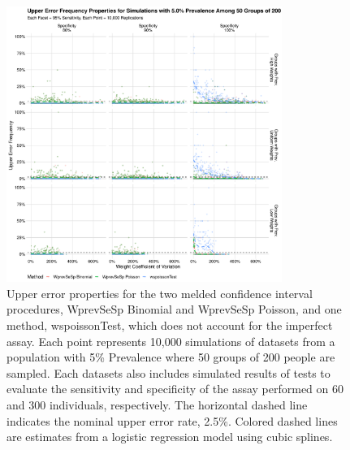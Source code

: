 \documentclass[AMA,STIX1COL]{WileyNJD-v2}
\begin{document}
\begin{figure}
\centering
\includegraphics[width=0.8\textwidth]{figures/imperfect_upper_error_frequency_50_groups_0_05_prev.pdf}
\caption{Upper error properties for the two melded confidence interval procedures, WprevSeSp Binomial and WprevSeSp Poisson, and one method, wspoissonTest, which does not account for the imperfect assay.
Each point represents 10,000 simulations of datasets from a population with 5\% Prevalence where 50 groups of 200 people are sampled.
Each datasets also includes simulated results of tests to evaluate the sensitivity and specificity of the assay performed on 60 and 300 individuals, respectively.
The horizontal dashed line indicates the nominal upper error rate, 2.5\%.
Colored dashed lines are estimates from a logistic regression model using cubic splines.}
\label{fig:imperfect_upper_error_frequency_50_groups_0_05_prev}
\end{figure}
\end{document}
